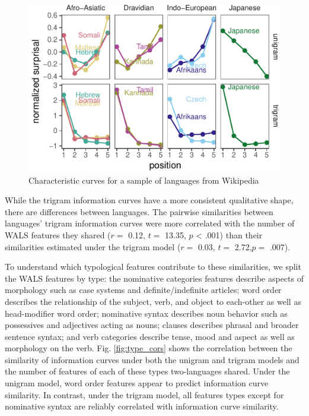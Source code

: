 \documentclass[10pt, letterpaper]{article}
\newenvironment{CodeChunk}{}{}
\begin{document}
\begin{CodeChunk}
\begin{figure}[tb]
\includegraphics{figs/diff-languages-1} \caption[Characteristic curves for a sample of languages from Wikipedia]{Characteristic curves for a sample of languages from Wikipedia}\label{fig:diff-languages}
\end{figure}
\end{CodeChunk}

While the trigram information curves have a more consistent qualitative
shape, there are differences between languages. The pairwise
similarities between languages' trigram information curves were more
correlated with the number of WALS features they shared (\(r =\) 0.12,
\(t =\) 13.35, \(p\) \textless{} .001) than their similarities estimated
under the trigram model (\(r =\) 0.03, \(t =\) 2.72,\(p =\) .007).

To understand which typological features contribute to these
similarities, we split the WALS features by type: the nominative
categories features describe aspects of morphology such as case systems
and definite/indefinite articles; word order describes the relationship
of the subject, verb, and object to each-other as well as head-modifier
word order; nominative syntax describes noun behavior such as
possessives and adjectives acting as nouns; clauses describes phrasal
and broader sentence syntax; and verb categories describe tense, mood
and aspect as well as morphology on the verb. Fig. \ref{fig:type_cors}
shows the correlation between the similarity of information curves under
both the unigram and trigram models and the number of features of each
of these types two-languages shared. Under the unigram model, word order
features appear to predict information curve similarity. In contrast,
under the trigram model, all features types except for nominative syntax
are reliably correlated with information curve similarity.
\end{document}
